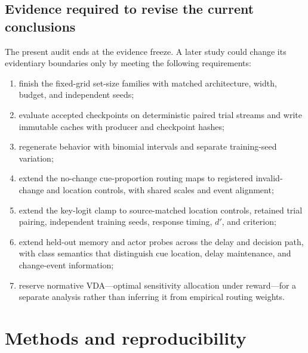 \documentclass[11pt,a4paper]{article}
\begin{document}
\subsection{Evidence required to revise the current conclusions}
The present audit ends at the evidence freeze. A later study could change its evidentiary boundaries only by meeting the following requirements:
\begin{enumerate}
\item finish the fixed-grid set-size families with matched architecture, width, budget, and independent seeds;
\item evaluate accepted checkpoints on deterministic paired trial streams and write immutable caches with producer and checkpoint hashes;
\item regenerate behavior with binomial intervals and separate training-seed variation;
\item extend the no-change cue-proportion routing maps to registered invalid-change and location controls, with shared scales and event alignment;
\item extend the key-logit clamp to source-matched location controls, retained trial pairing, independent training seeds, response timing, $d'$, and criterion;
\item extend held-out memory and actor probes across the delay and decision path, with class semantics that distinguish cue location, delay maintenance, and change-event information;
\item reserve normative VDA---optimal sensitivity allocation under reward---for a separate analysis rather than inferring it from empirical routing weights.
\end{enumerate}

\section{Methods and reproducibility}
\end{document}
